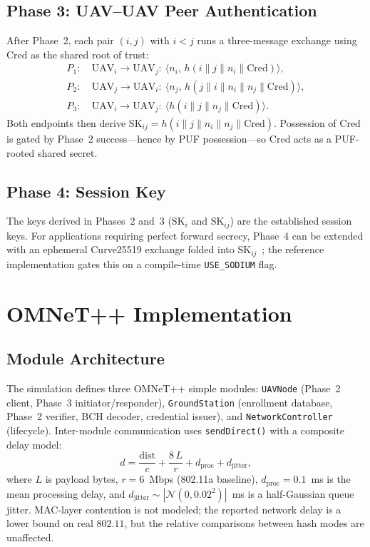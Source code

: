\documentclass[conference,a4paper,10pt]{IEEEtran}
\begin{document}
\subsection{Phase 3: UAV--UAV Peer Authentication}
After Phase~2, each pair $(i,j)$ with $i{<}j$ runs a three-message
exchange using $\mathrm{Cred}$ as the shared root of trust:
\begin{align}
P_1: &\ \mathrm{UAV}_i \to \mathrm{UAV}_j:\ \langle n_i,\,
  h(i\|j\|n_i\|\mathrm{Cred}) \rangle, \\
P_2: &\ \mathrm{UAV}_j \to \mathrm{UAV}_i:\ \langle n_j,\,
  h(j\|i\|n_i\|n_j\|\mathrm{Cred}) \rangle, \\
P_3: &\ \mathrm{UAV}_i \to \mathrm{UAV}_j:\ \langle
  h(i\|j\|n_j\|\mathrm{Cred}) \rangle.
\end{align}
Both endpoints then derive
$\mathrm{SK}_{ij}=h(i\|j\|n_i\|n_j\|\mathrm{Cred})$. Possession of
$\mathrm{Cred}$ is gated by Phase~2 success---hence by PUF
possession---so $\mathrm{Cred}$ acts as a PUF-rooted shared secret.

\subsection{Phase 4: Session Key}
The keys derived in Phases~2 and~3 ($\mathrm{SK}_i$ and
$\mathrm{SK}_{ij}$) are the established session keys.
For applications requiring perfect forward secrecy, Phase~4 can be
extended with an ephemeral Curve25519 exchange folded into
$\mathrm{SK}_{ij}$~\cite{puf_key_exchange}; the reference
implementation gates this on a compile-time \texttt{USE\_SODIUM} flag.


\section{OMNeT++ Implementation}
\label{sec:implementation}

\subsection{Module Architecture}
The simulation defines three OMNeT++ simple modules:
\texttt{UAVNode} (Phase~2 client, Phase~3 initiator/responder),
\texttt{GroundStation} (enrollment database, Phase~2 verifier, BCH
decoder, credential issuer), and \texttt{NetworkController}
(lifecycle). Inter-module communication uses
\texttt{sendDirect()} with a composite delay model:
\begin{equation}
d = \frac{\mathrm{dist}}{c}
  + \frac{8\,L}{r}
  + d_{\mathrm{proc}}
  + d_{\mathrm{jitter}},
\label{eq:delay}
\end{equation}
where $L$ is payload bytes, $r{=}6$~Mbps (802.11a baseline),
$d_{\mathrm{proc}}{=}0.1$~ms is the mean processing delay, and
$d_{\mathrm{jitter}}{\sim}|\mathcal{N}(0, 0.02^2)|$~ms is a
half-Gaussian queue jitter. MAC-layer contention is not modeled; the
reported network delay is a lower bound on real $802.11$, but the
relative comparisons between hash modes are unaffected.
\end{document}
